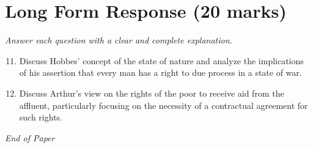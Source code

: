 \documentclass[12pt]{article}
\begin{document}
\section*{Long Form Response (20 marks)}
\textit{Answer each question with a clear and complete explanation.}
\begin{enumerate}[label=\arabic*.]
\setcounter{enumi}{10}
\item Discuss Hobbes' concept of the state of nature and analyze the implications of his assertion that every man has a right to due process in a state of war.
\item Discuss Arthur's view on the rights of the poor to receive aid from the affluent, particularly focusing on the necessity of a contractual agreement for such rights.
\end{enumerate}

\vfill
\noindent\textit{End of Paper}
\end{document}
